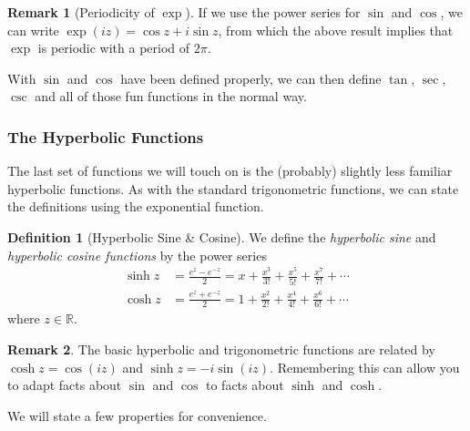 \documentclass[11pt, a4paper]{article}
\theoremstyle{definition}
\newtheorem{definition}[theorem]{Definition}
\newtheorem*{remark}{Remark}
\newcommand{\vocab}[1]{\emph{#1}} %
\newcommand{\R}{\mathbb{R}}
\begin{document}
\begin{remark}[Periodicity of $\exp$]
	If we use the power series for $\sin$ and $\cos$, we can write $\exp(iz) = \cos z + i \sin z$, from which the above result implies that $\exp$ is periodic with a period of $2\pi$.
\end{remark}

With $\sin$ and $\cos$ have been defined properly, we can then define $\tan$, $\sec$, $\csc$ and all of those fun functions in the normal way.

\subsubsection{The Hyperbolic Functions}

The last set of functions we will touch on is the (probably) slightly less familiar hyperbolic functions. As with the standard trigonometric functions, we can state the definitions using the exponential function.

\begin{definition}[Hyperbolic Sine \& Cosine]
	We define the \vocab{hyperbolic sine} and \vocab{hyperbolic cosine functions} by the power series
	\begin{align*}
		\sinh z &= \frac{e^z - e^{-z}}{2} = x+\frac{x^{3}}{3 !}+\frac{x^{5}}{5 !}+\frac{x^{7}}{7 !}+\cdots \\
		\cosh z &= \frac{e^z + e^{-z}}{2} = 1+\frac{x^{2}}{2 !}+\frac{x^{4}}{4 !}+\frac{x^{6}}{6 !}+\cdots
	\end{align*}
	where $z \in \R$.
\end{definition}

\begin{remark}
	The basic hyperbolic and trigonometric functions are related by $\cosh z = \cos(iz)$ and $\sinh z = -i \sin (iz)$. Remembering this can allow you to adapt facts about $\sin$ and $\cos$ to facts about $\sinh$ and $\cosh$.
\end{remark}

We will state a few properties for convenience.
\end{document}
